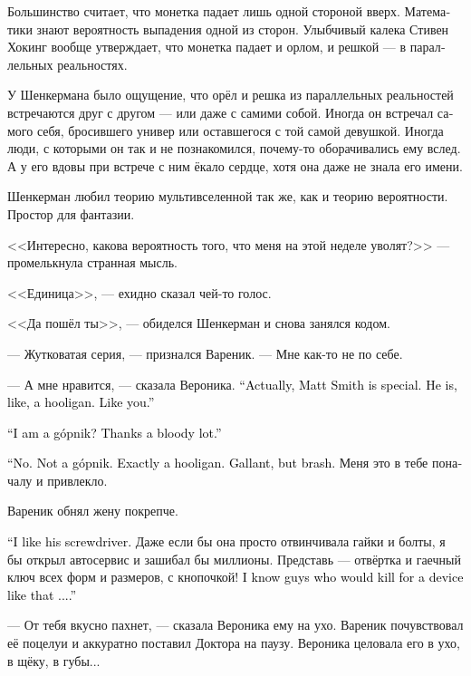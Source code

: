 \documentclass[a5paper,12pt,fleqn]{extbook}\usepackage{cooltooltips}\usepackage{polyglossia}\setdefaultlanguage[babelshorthands=true]{russian}\setotherlanguage{english}\defaultfontfeatures{Ligatures=TeX,Mapping=tex-text} \usepackage{xcolor}\definecolor{lightgray}{HTML}{bbbbbb}\color{lightgray}\newcommand{\ml}[3]{\textenglish{\textcolor{black}{#3}}}
\newcommand{\asterism}{\vspace{1em}{\centering\Large\bfseries$\ast~\ast~\ast$\par}\vspace{1em}}
\newcommand{\textspace}{\vspace{1em}{\centering\Large\bfseries<...>\par}\vspace{1em}}
\newcommand{\gopnik}{g\'opnik}
\begin{document}
Большинство считает, что монетка падает лишь одной стороной вверх.
Математики знают вероятность выпадения одной из сторон.
Улыбчивый калека Стивен Хокинг вообще утверждает, что монетка падает и орлом, и решкой --- в параллельных реальностях.

У Шенкермана было ощущение, что орёл и решка из параллельных реальностей встречаются друг с другом --- или даже с самими собой.
Иногда он встречал самого себя, бросившего универ или оставшегося с той самой девушкой.
Иногда люди, с которыми он так и не познакомился, почему-то оборачивались ему вслед.
А у его вдовы при встрече с ним ёкало сердце, хотя она даже не знала его имени.

Шенкерман любил теорию мультивселенной так же, как и теорию вероятности.
Простор для фантазии.

<<Интересно, какова вероятность того, что меня на этой неделе уволят?>> --- промелькнула странная мысль.

<<Единица>>, --- ехидно сказал чей-то голос.

<<Да пошёл ты>>, --- обиделся Шенкерман и снова занялся кодом.

\asterism

\textspace

--- Жутковатая серия, --- признался Вареник.
--- Мне как-то не по себе.

--- А мне нравится, --- сказала Вероника.
\ml{$0$}
{--- Вообще Мэтт Смит особенный.}
{``Actually, Matt Smith is special.}
\ml{$0$}
{Он какой-то такой... хулиган.}
{He is, like, a hooligan.}
\ml{$0$}
{Как ты.}
{Like you.''}

\ml{$0$}
{--- Я --- гопник?}
{``I am a \gopnik?}
\ml{$0$}
{Ну спасибо.}
{Thanks a bloody lot.''}

\ml{$0$}
{--- Нет.}
{``No.}
\ml{$0$}
{Не гопник.}
{Not a \gopnik.}
\ml{$0$}
{Именно хулиган.}
{Exactly a hooligan.}
\ml{$0$}
{Галантный, но дерзкий.}
{Gallant, but brash.}
Меня это в тебе поначалу и привлекло.

Вареник обнял жену покрепче.

\ml{$0$}
{--- А мне нравится его отвёртка.}
{``I like his screwdriver.}
Даже если бы она просто отвинчивала гайки и болты, я бы открыл автосервис и зашибал бы миллионы.
Представь --- отвёртка и гаечный ключ всех форм и размеров, с кнопочкой!
\ml{$0$}
{Я знаю пацанов, которые бы убили за такой девайс...}
{I know guys who would kill for a device like that ....''}

--- От тебя вкусно пахнет, --- сказала Вероника ему на ухо.
Вареник почувствовал её поцелуи и аккуратно поставил Доктора на паузу.
Вероника целовала его в ухо, в щёку, в губы...
\end{document}
